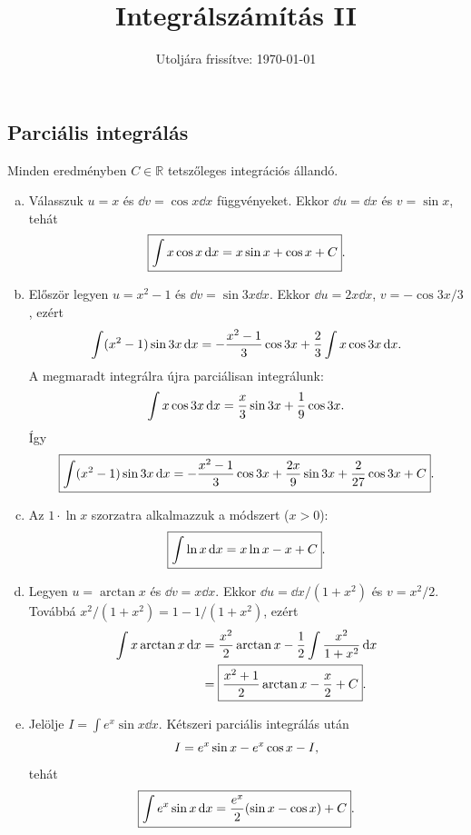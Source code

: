 \documentclass{szb-solution}
\title{Integrálszámítás II}
\date{Utoljára frissítve: \today}
\begin{document}
\maketitle

\subsection{Parciális integrálás}

Minden eredményben $C\in\mathbb R$ tetszőleges integrációs állandó.

\begin{enumerate}[a)]
  \item Válasszuk $u=x$ és $\dd v=\cos x\dd x$ függvényeket. Ekkor
        $\dd u=\dd x$ és $v=\sin x$, tehát
        $$
          \boxed{\int x\cos x\mathop{}\!\mathrm{d} x=x\sin x+\cos x+C}
          \text.
        $$

  \item Először legyen $u=x^2-1$ és $\dd v=\sin3x\dd x$. Ekkor
        $\dd u=2x\dd x$, $v=-\cos3x/3$, ezért
        $$
          \int(x^2-1)\sin3x\mathop{}\!\mathrm{d} x
          =-\frac{x^2-1}{3}\cos3x+\frac23\int x\cos3x\mathop{}\!\mathrm{d} x
          \text.
        $$
        A megmaradt integrálra újra parciálisan integrálunk:
        $$
          \int x\cos3x\mathop{}\!\mathrm{d} x
          =\frac{x}{3}\sin3x+\frac19\cos3x
          \text.
        $$
        Így
        $$
          \boxed{\int(x^2-1)\sin3x\mathop{}\!\mathrm{d} x
          =-\frac{x^2-1}{3}\cos3x
           +\frac{2x}{9}\sin3x+\frac{2}{27}\cos3x+C}
          \text.
        $$

  \item Az $1\cdot\ln x$ szorzatra alkalmazzuk a módszert ($x>0$):
        $$
          \boxed{\int\ln x\mathop{}\!\mathrm{d} x=x\ln x-x+C}
          \text.
        $$

  \item Legyen $u=\arctan x$ és $\dd v=x\dd x$. Ekkor
        $\dd u=\dd x/(1+x^2)$ és $v=x^2/2$. Továbbá
        $x^2/(1+x^2)=1-1/(1+x^2)$, ezért
        \begin{align*}
          \int x\arctan x\mathop{}\!\mathrm{d} x
          &=\frac{x^2}{2}\arctan x
            -\frac12\int\frac{x^2}{1+x^2}\mathop{}\!\mathrm{d} x\\
          &=\boxed{\frac{x^2+1}{2}\arctan x-\frac{x}{2}+C}
          \text.
        \end{align*}

  \item Jelölje $I=\int e^x\sin x\dd x$. Kétszeri parciális integrálás után
        $$
          I=e^x\sin x-e^x\cos x-I
          \text,
        $$
        tehát
        $$
          \boxed{\int e^x\sin x\mathop{}\!\mathrm{d} x
          =\frac{e^x}{2}(\sin x-\cos x)+C}
          \text.
        $$


\end{enumerate}
\end{document}

